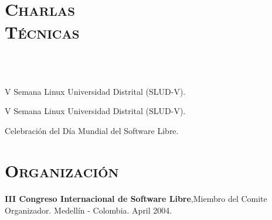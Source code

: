 \begin{resume}
\section{\textsc{Charlas \\ T\'{e}cnicas}}

\begin{formatb}
  \\
  \\
   \body
\end{formatb}

\begin{position}
V Semana Linux Universidad Distrital (SLUD-V).
\end{position}
\newline     
\newline
\newline
\newline     
\newline
\newline
\newline
\newline



\begin{position}
V Semana Linux Universidad Distrital (SLUD-V).
\end{position}


\begin{position}
Celebraci\'{o}n del D\'{i}a Mundial del Software Libre.
\end{position}



\section{\textsc{Organizaci\'{o}n}}
\employer{\textbf{}}
\dates{}
\textbf{III Congreso Internacional de Software Libre},Miembro del Comite Organizador. Medell\'{i}n - Colombia. April 2004.
\newline     



\end{resume}

